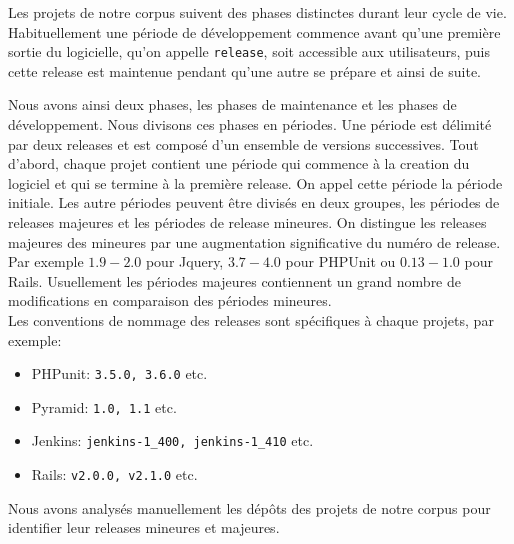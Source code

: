 Les projets de notre corpus suivent des phases distinctes durant leur cycle de vie. Habituellement une période de développement commence avant qu'une première sortie du logicielle, qu'on appelle \texttt{release}, soit accessible aux utilisateurs, puis cette release est maintenue pendant qu'une autre se prépare et ainsi de suite.

Nous avons ainsi deux phases, les phases de maintenance et les phases de développement. Nous divisons ces phases en périodes. Une période est délimité par deux releases et est composé d'un ensemble de versions successives. Tout d'abord, chaque projet contient une période qui commence à la creation du logiciel et qui se termine à la première release. On appel cette période la période initiale. Les autre périodes peuvent être divisés en deux groupes, les périodes de releases majeures et les périodes de release mineures. On distingue les releases majeures des mineures par une augmentation significative du numéro de release. Par exemple $1.9-2.0$ pour Jquery, $3.7-4.0$ pour PHPUnit ou $0.13-1.0$ pour Rails. Usuellement les périodes majeures contiennent un grand nombre de modifications en comparaison des périodes mineures.\\

Les conventions de nommage des releases sont spécifiques à chaque projets, par exemple:
\begin{itemize}
\item PHPunit: \texttt{3.5.0, 3.6.0} etc.
\item Pyramid: \texttt{1.0, 1.1} etc.
\item Jenkins: \texttt{jenkins-1\_400, jenkins-1\_410} etc.
\item Rails: \texttt{v2.0.0, v2.1.0} etc.
\end{itemize}
Nous avons analysés manuellement les dépôts des projets de notre corpus pour identifier leur releases mineures et majeures.\\




